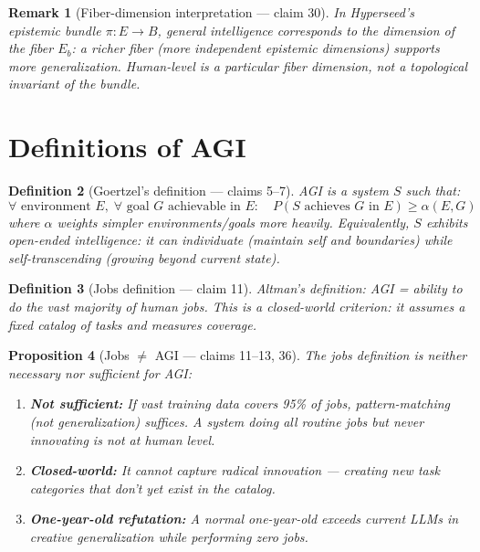 \documentclass[11pt,a4paper]{article}
\newtheorem{definition}{Definition}[section]
\newtheorem{proposition}[definition]{Proposition}
\newtheorem{remark}[definition]{Remark}
\begin{document}
\begin{remark}[Fiber-dimension interpretation --- claim 30]
In Hyperseed's epistemic bundle $\pi : E \to B$, general intelligence
corresponds to the \emph{dimension} of the fiber $E_b$: a richer fiber
(more independent epistemic dimensions) supports more generalization.
Human-level is a particular fiber dimension, not a topological invariant
of the bundle.
\end{remark}

\section{Definitions of AGI}
\label{sec:definitions}

\begin{definition}[Goertzel's definition --- claims 5--7]
\label{def:goertzel-agi}
AGI is a system $S$ such that:
\[
  \forall \text{ environment } E,\; \forall \text{ goal } G \text{ achievable in } E:
  \quad P(S \text{ achieves } G \text{ in } E) \geq \alpha(E, G)
\]
where $\alpha$ weights simpler environments/goals more heavily. Equivalently,
$S$ exhibits \emph{open-ended intelligence}: it can individuate (maintain
self and boundaries) while self-transcending (growing beyond current state).
\end{definition}

\begin{definition}[Jobs definition --- claim 11]
\label{def:jobs-agi}
Altman's definition: AGI = ability to do the vast majority of human jobs.
This is a \emph{closed-world} criterion: it assumes a fixed catalog of
tasks and measures coverage.
\end{definition}

\begin{proposition}[Jobs $\neq$ AGI --- claims 11--13, 36]
\label{prop:jobs-not-agi}
The jobs definition is neither necessary nor sufficient for AGI:
\begin{enumerate}
\item \textbf{Not sufficient:} If vast training data covers 95\% of jobs,
  pattern-matching (not generalization) suffices. A system doing all
  routine jobs but never innovating is not at human level.
\item \textbf{Closed-world:} It cannot capture radical innovation ---
  creating new task categories that don't yet exist in the catalog.
\item \textbf{One-year-old refutation:} A normal one-year-old exceeds
  current LLMs in creative generalization while performing zero jobs.
\end{enumerate}
\end{proposition}
\end{document}
